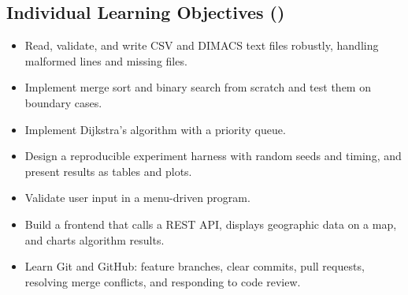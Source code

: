 \documentclass[11pt]{article}
\newcommand{\nameA}{Firstname LastnameA}
\newcommand{\nameB}{Firstname LastnameB}
\newif\ifMemberA
\newcommand{\me}{\ifMemberA\nameA\else\nameB\fi}
\begin{document}
\subsection*{Individual Learning Objectives (\me)}
\ifMemberA
I have completed similar C++ projects before, so my objectives focus on
taking existing skills to a research-quality level:
\begin{itemize}
  \item Engineer the flow algorithms for performance (Johnson potentials,
        profiling, cache-friendly edge arrays) and measure the effect.
  \item Verify correctness rigorously with invariants and a brute-force
        oracle, beyond ordinary unit tests.
  \item Design and analyze experiments statistically (replication,
        confidence intervals, sensitivity analysis), and relate measured
        runtimes to theoretical complexity.
  \item Design a clean REST API in C++ that keeps the algorithm core
        independent of the web layer, and handle concurrent requests and
        input validation safely.
  \item Write a conference-style paper: literature positioning, methods,
        results, and limitations.
  \item Lead the repository and code-review process and mentor a teammate
        who is new to Git and GitHub.
\end{itemize}
\else
\begin{itemize}
  \item Read, validate, and write CSV and DIMACS text files robustly,
        handling malformed lines and missing files.
  \item Implement merge sort and binary search from scratch and test them on
        boundary cases.
  \item Implement Dijkstra's algorithm with a priority queue.
  \item Design a reproducible experiment harness with random seeds and
        timing, and present results as tables and plots.
  \item Validate user input in a menu-driven program.
  \item Build a frontend that calls a REST API, displays geographic data on
        a map, and charts algorithm results.
  \item Learn Git and GitHub: feature branches, clear commits, pull
        requests, resolving merge conflicts, and responding to code review.
\end{itemize}
\fi
\end{document}
